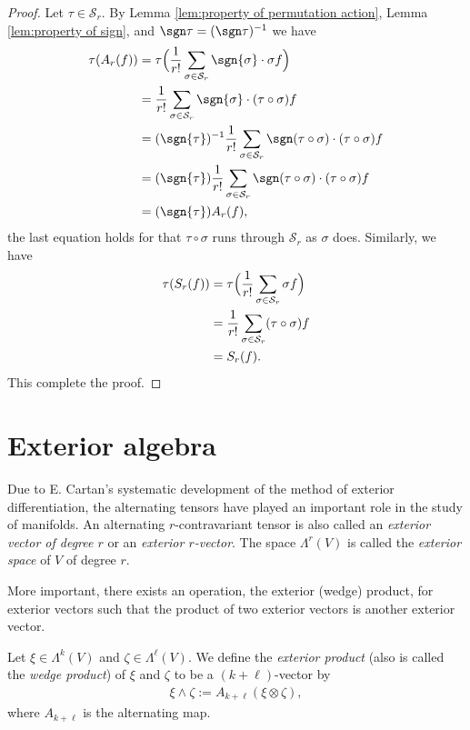\begin{proof}
    Let $\tau \in \mathcal{S}_r$. By Lemma \ref{lem:property of permutation action}, Lemma \ref{lem:property of sign}, and $\sgn\tau = (\sgn\tau)^{-1}$ we have
    \begin{align*}
        \tau(A_r(f))
        &= \tau\Bigl(\frac{1}{r!}\sum_{\sigma \in \mathcal{S}_r}\sgn{\sigma} \cdot \sigma f\Bigr)\\
        &= \frac{1}{r!}\sum_{\sigma \in \mathcal{S}_r}\sgn{\sigma} \cdot (\tau \circ \sigma) f\\
        &= (\sgn{\tau})^{-1}\frac{1}{r!}\sum_{\sigma \in \mathcal{S}_r}\sgn(\tau \circ \sigma) \cdot (\tau \circ \sigma) f\\
        &= (\sgn{\tau})\frac{1}{r!}\sum_{\sigma \in \mathcal{S}_r}\sgn(\tau \circ \sigma) \cdot (\tau \circ \sigma) f\\
        &= (\sgn{\tau})A_r(f),
    \end{align*}
    the last equation holds for that $\tau \circ \sigma$ runs through $\mathcal{S}_r$ as $\sigma$ does. Similarly, we have
    \begin{align*}
        \tau(S_r(f))
        &= \tau\Bigl(\frac{1}{r!}\sum_{\sigma \in \mathcal{S}_r}\sigma f\Bigr)\\
        &= \frac{1}{r!}\sum_{\sigma \in \mathcal{S}_r}(\tau \circ \sigma)f\\
        &= S_r(f).
    \end{align*}
This complete the proof.
\end{proof}


\section{Exterior algebra}

Due to E. Cartan's systematic development of the method of exterior differentiation, the alternating tensors have played an important role in the study of manifolds. An alternating $r$-contravariant tensor is also called an \emph{exterior vector of degree $r$} or an \emph{exterior $r$-vector}. The space $\Lambda^r(V)$ is called the \emph{exterior space} of $V$ of degree $r$.

More important, there exists an operation, the exterior (wedge) product, for exterior vectors such that the product of two exterior vectors is another exterior vector.

\begin{definition}[Exterior product]
    Let $\xi \in \Lambda^{k}(V)$ and $\zeta \in \Lambda^{\ell}(V)$. We define the \emph{exterior product} (also is called the \emph{wedge product}) of $\xi$ and $\zeta$ to be a $(k + \ell)$-vector by
    \begin{align*}
        \xi \wedge \zeta := A_{k + \ell}(\xi \otimes \zeta),
    \end{align*}
    where $A_{k + \ell}$ is the alternating map.
\end{definition}

